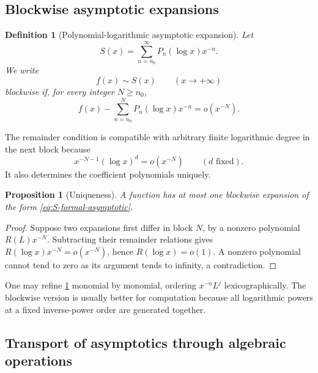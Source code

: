 \documentclass[11pt]{article}
\theoremstyle{pltheorem}
\newtheorem{proposition}[theorem]{Proposition}
\newtheorem{definition}[theorem]{Definition}
\newcommand{\littleo}{o}
\begin{document}
\subsection{Blockwise asymptotic expansions}

\begin{definition}[Polynomial-logarithmic asymptotic expansion]\label{def:block-asymptotic}
Let
\begin{equation}\label{eq:S-formal-asymptotic}
 S(x)=\sum_{n=n_0}^{\infty}P_n(\log x)x^{-n}.
\end{equation}
We write
\begin{equation}\label{eq:f-sim-S}
 f(x)\sim S(x)\qquad(x\to+\infty)
\end{equation}
blockwise if, for every integer \(N\ge n_0\),
\begin{equation}\label{eq:block-remainder}
 f(x)-\sum_{n=n_0}^{N}P_n(\log x)x^{-n}
 =\littleo(x^{-N}).
\end{equation}
\end{definition}

The remainder condition is compatible with arbitrary finite logarithmic degree in the next block because
\begin{equation}\label{eq:log-smaller-power}
 x^{-N-1}(\log x)^d=\littleo(x^{-N})
 \qquad(d\text{ fixed}).
\end{equation}
It also determines the coefficient polynomials uniquely.

\begin{proposition}[Uniqueness]\label{prop:asymptotic-uniqueness}
A function has at most one blockwise expansion of the form
\cref{eq:S-formal-asymptotic}.
\end{proposition}

\begin{proof}
Suppose two expansions first differ in block \(N\), by a nonzero polynomial
\(R(L)x^{-N}\).  Subtracting their remainder relations gives
\(R(\log x)x^{-N}=\littleo(x^{-N})\), hence
\(R(\log x)=\littleo(1)\).  A nonzero polynomial cannot tend to zero as its argument tends to infinity, a contradiction.
\end{proof}

One may refine \cref{def:block-asymptotic} monomial by monomial, ordering
\(x^{-n}L^j\) lexicographically.  The blockwise version is usually better for computation because all logarithmic powers at a fixed inverse-power order are generated together.

\subsection{Transport of asymptotics through algebraic operations}
\end{document}

